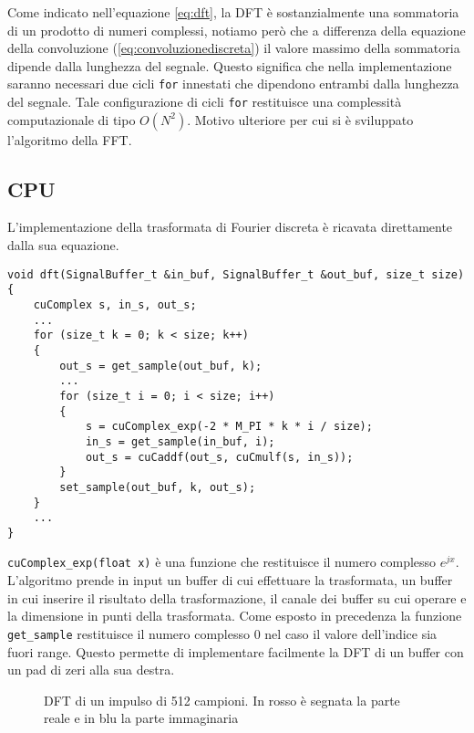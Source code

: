 Come indicato nell'equazione \ref{eq:dft}, la DFT è sostanzialmente una sommatoria di un prodotto di numeri complessi, notiamo però che a differenza della equazione della convoluzione (\ref{eq:convoluzionediscreta}) il valore massimo della sommatoria dipende dalla lunghezza del segnale. Questo significa che nella implementazione saranno necessari due cicli \lstinline{for} innestati che dipendono entrambi dalla lunghezza del segnale. Tale configurazione di cicli \lstinline{for} restituisce una complessità computazionale di tipo $O(N^2)$. Motivo ulteriore per cui si è sviluppato l'algoritmo della FFT.

\subsection{CPU}
L'implementazione della trasformata di Fourier discreta è ricavata direttamente dalla sua equazione.

\begin{lstlisting}
void dft(SignalBuffer_t &in_buf, SignalBuffer_t &out_buf, size_t size)
{
    cuComplex s, in_s, out_s;
    ...
    for (size_t k = 0; k < size; k++)
    {
        out_s = get_sample(out_buf, k);
        ...
        for (size_t i = 0; i < size; i++)
        {
            s = cuComplex_exp(-2 * M_PI * k * i / size);
            in_s = get_sample(in_buf, i);
            out_s = cuCaddf(out_s, cuCmulf(s, in_s));
        }
        set_sample(out_buf, k, out_s);
    }
    ...
}
\end{lstlisting}

\lstinline{cuComplex_exp(float x)} è una funzione che restituisce il numero complesso $e^{jx}$. L'algoritmo prende in input un buffer di cui effettuare la trasformata, un buffer in cui inserire il risultato della trasformazione, il canale dei buffer su cui operare e la dimensione in punti della trasformata. Come esposto in precedenza la funzione \lstinline{get_sample} restituisce il numero complesso $0$ nel caso il valore dell'indice sia fuori range. Questo permette di implementare facilmente la DFT di un buffer con un pad di zeri alla sua destra.

\begin{figure}[h]
    \centering
    \caption{DFT di un impulso di 512 campioni. In rosso è segnata la parte reale e in blu la parte immaginaria}
    \label{fig:pulse512}
\end{figure}


